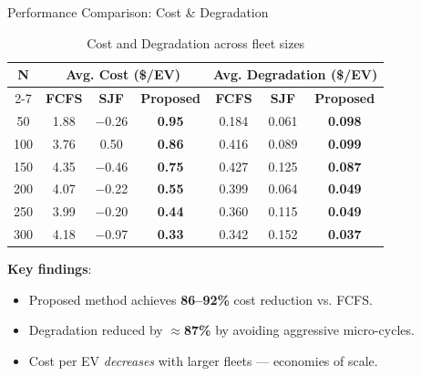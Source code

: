 \documentclass{beamer}
\begin{document}
\begin{frame}{Performance Comparison: Cost \& Degradation}
  \begin{table}[]
  \centering
  \footnotesize
  \begin{tabular}{|c|c|c|c|c|c|c|}
  \hline
  \multirow{2}{*}{\textbf{N}} & \multicolumn{3}{c|}{\textbf{Avg. Cost (\$/EV)}} & \multicolumn{3}{c|}{\textbf{Avg. Degradation (\$/EV)}} \\
  \cline{2-7}
   & \textbf{FCFS} & \textbf{SJF} & \textbf{Proposed} & \textbf{FCFS} & \textbf{SJF} & \textbf{Proposed} \\
  \hline
  50  & 1.88 & $-$0.26 & \textbf{0.95} & 0.184 & 0.061 & \textbf{0.098} \\
  \hline
  100 & 3.76 & 0.50  & \textbf{0.86} & 0.416 & 0.089 & \textbf{0.099} \\
  \hline
  150 & 4.35 & $-$0.46 & \textbf{0.75} & 0.427 & 0.125 & \textbf{0.087} \\
  \hline
  200 & 4.07 & $-$0.22 & \textbf{0.55} & 0.399 & 0.064 & \textbf{0.049} \\
  \hline
  250 & 3.99 & $-$0.20 & \textbf{0.44} & 0.360 & 0.115 & \textbf{0.049} \\
  \hline
  300 & 4.18 & $-$0.97 & \textbf{0.33} & 0.342 & 0.152 & \textbf{0.037} \\
  \hline
  \end{tabular}
  \caption{Cost and Degradation across fleet sizes}
  \end{table}
  \textbf{Key findings}:
  \begin{itemize}
      \item Proposed method achieves \textbf{86--92\%} cost reduction vs. FCFS.
      \item Degradation reduced by \textbf{$\approx$87\%} by avoiding aggressive micro-cycles.
      \item Cost per EV \textit{decreases} with larger fleets --- economies of scale.
  \end{itemize}
\end{frame}
\end{document}
